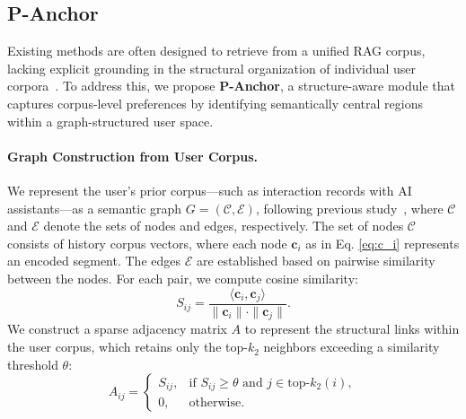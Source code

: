 \subsection{P-Anchor}
Existing methods are often designed to retrieve from a unified RAG corpus, lacking explicit grounding in the structural organization of individual user corpora~\cite{tan2025personabench,wu2025longmemeval}.
To address this, we propose \textbf{P-Anchor}, a structure-aware module that captures corpus-level preferences by identifying semantically central regions within a graph-structured user space.

\paragraph{Graph Construction from User Corpus.}
We represent the user's prior corpus—such as interaction records with AI assistants—as a semantic graph $G = (\mathcal{C}, \mathcal{E})$, following previous study~\cite{tang2025llm4tag}, where $\mathcal{C}$  and $\mathcal{E}$ denote the sets of nodes and edges, respectively. 
The set of nodes $\mathcal{C}$ consists of history corpus vectors, where each node $\mathbf{c}_i$ as in Eq. \eqref{eq:c_i} represents an encoded segment. The edges $\mathcal{E}$ are established based on pairwise similarity between the nodes.
For each pair, we compute cosine similarity:
\begin{equation}
S_{ij} = \frac{\langle \mathbf{c}_i, \mathbf{c}_j \rangle}{\|\mathbf{c}_i\| \cdot \|\mathbf{c}_j\|}.
\end{equation}
We construct a sparse adjacency matrix $A$ to represent the structural links within the user corpus, which retains only the top-$k_2$ neighbors exceeding a similarity threshold $\theta$:
\begin{equation}
A_{ij} = 
\begin{cases}
S_{ij}, & \text{if } S_{ij} \geq \theta \text{ and } j \in \text{top-}k_2(i), \\
0, & \text{otherwise}.
\end{cases}
\end{equation}

